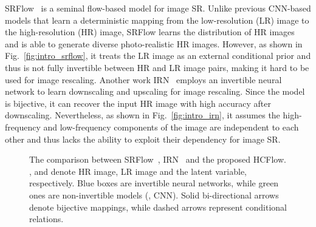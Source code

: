 \documentclass[10pt,twocolumn,letterpaper]{article}
\begin{document}
SRFlow~\cite{lugmayr2020srflow} is a seminal flow-based model for image SR. Unlike previous CNN-based models that learn a deterministic mapping from the low-resolution (LR) image to the high-resolution (HR) image, SRFlow learns the distribution of HR images and is able to generate diverse photo-realistic HR images. However, as shown in Fig.~\ref{fig:intro_srflow}, it treats the LR image as an external conditional prior and thus is not fully invertible between HR and LR image pairs, making it hard to be used for image rescaling. Another work IRN~\cite{xiao2020IRN} employs an invertible neural network to learn downscaling and upscaling for image rescaling. Since the model is bijective, it can recover the input HR image with high accuracy after downscaling. Nevertheless, as shown in Fig.~\ref{fig:intro_irn}, it assumes the high-frequency and low-frequency components of the image are independent to each other and thus lacks the ability to exploit their dependency for image SR.


\begin{figure}[!tbp]
\captionsetup{font=small}\scriptsize
\begin{center}
\subfigcapskip=0.2cm
\hspace{1.5cm}
\vspace{0.cm}
\end{center}
\vspace{-0.7cm}
\caption{The comparison between SRFlow~\cite{lugmayr2020srflow}, IRN~\cite{xiao2020IRN} and the proposed HCFlow. ,  and  denote HR image, LR image and the latent variable, respectively. Blue boxes are invertible neural networks, while green ones are non-invertible models (\eg, CNN). Solid bi-directional arrows denote bijective mappings, while dashed arrows represent conditional relations.}
\label{fig:intro}
\vspace{-0.2cm}
\end{figure}
\subfigcapskip=0.1cm
\end{document}
